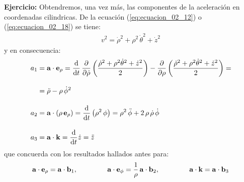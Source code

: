 \noindent
\textbf{Ejercicio: } Obtendremos, una vez más, las componentes de la aceleración en coordenadas cilindricas. De la ecuación (\ref{eq:ecuacion_02_12}) o (\ref{eq:ecuacion_02_18}) se tiene:
\begin{align*}
    v^{2} = \dot{\rho}^{2} + \rho^{2} \, \dot{\theta}^{2} + \dot{z}^{2}
\end{align*}
y en consecuencia:
\begin{align*}
    a_{1} &= \vb{a} \cdot \vb{e}_{\rho} = \dv{t} \, \pdv{\dot{\rho}} \left( \dfrac{\dot{\rho}^{2} + \rho^{2} \dot{\theta}^{2} + \dot{z}^{2}}{2} \right) - \pdv{\rho} \left( \dfrac{\dot{\rho}^{2} + \rho^{2} \dot{\theta}^{2} + \dot{z}^{2}}{2} \right) = \\[1em]
    &= \ddot{\rho} - \rho \, \dot{\phi}^{2} \\[1em]
    a_{2} &= \vb{a} \cdot \left( \rho \, \vb{e}_{\rho} \right) = \dv{t} \left( \rho^{2} \, \phi \right) = \rho^{2} \, \ddot{\phi} + 2 \, \rho \, \dot{\rho} \, \dot{\phi} \\[1em]
    a_{3} &= \vb{a} \cdot \vb{k} = \dv{t} \dot{z} = \ddot{z}
\end{align*}
que concuerda con los resultados hallados antes para:
\begin{align*}
    \vb{a} \cdot \vb{e}_{\rho} = \vb{a} \cdot \vb{b}_{1}, \hspace{1.5cm} \vb{a} \cdot \vb{e}_{\phi} =\dfrac{1}{\rho} \, \vb{a} \cdot \vb{b}_{2}, \hspace{1.5cm} \vb{a} \cdot \vb{k} = \vb{a} \cdot \vb{b}_{3}
\end{align*}

